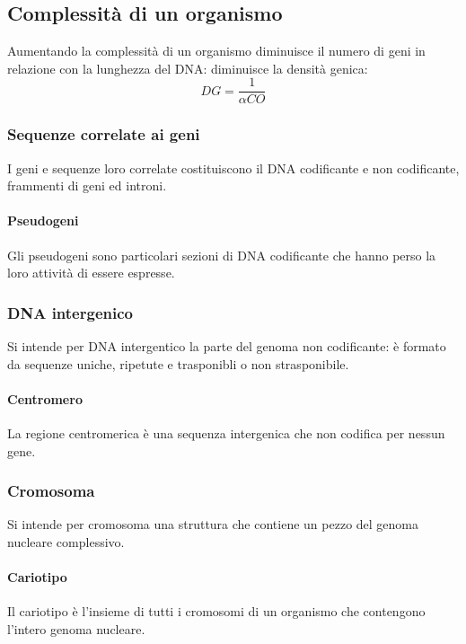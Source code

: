 	\subsection{Complessit\`a di un organismo}
	Aumentando la complessit\`a di un organismo diminuisce il numero di geni in relazione con la lunghezza del DNA: diminuisce la densit\`a genica:
	\[DG=\dfrac{1}{\alpha CO}\]

		\subsubsection{Sequenze correlate ai geni}
		I geni e sequenze loro correlate costituiscono il DNA codificante e non codificante, frammenti di geni ed introni.

			\paragraph{Pseudogeni}
			Gli pseudogeni sono particolari sezioni di DNA codificante che hanno perso la loro attivit\`a di essere espresse.

		\subsubsection{DNA intergenico}
		Si intende per DNA intergentico la parte del genoma non codificante: \`e formato da sequenze uniche, ripetute e trasponibli o non strasponibile.

			\paragraph{Centromero}
			La regione centromerica \`e una sequenza intergenica che non codifica per nessun gene.


		\subsubsection{Cromosoma}
		Si intende per cromosoma una struttura che contiene un pezzo del genoma nucleare complessivo.

			\paragraph{Cariotipo}
			Il cariotipo \`e l'insieme di tutti i cromosomi di un organismo che contengono l'intero genoma nucleare.
